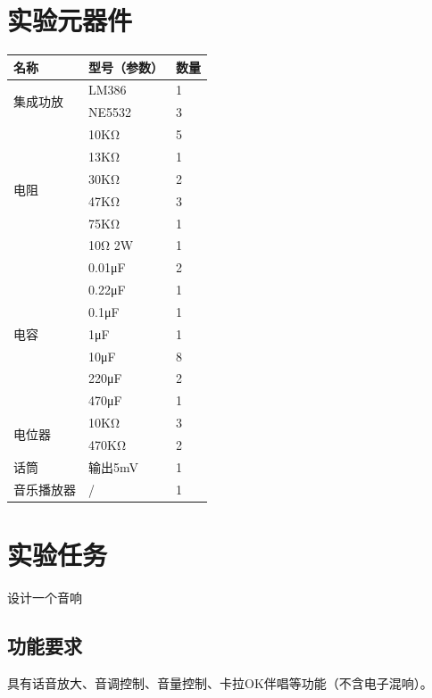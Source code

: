 \documentclass[a4paper]{article}
\theoremstyle{definition}
\theoremstyle{plain}
\theoremstyle{remark}
\begin{document}
\section{实验元器件}
\begin{table}[H]
	\centering
	\begin{tabularx}{0.8\textwidth}{|X|X|X|}
		\hline
		名称                    & 型号（参数） & 数量 \\ \hline
		\multirow{2}{*}{集成功放} & LM386  & 1  \\ \cline{2-3}
		                      & NE5532 & 3  \\ \hline
		\multirow{6}{*}{电阻}   & 10KΩ   & 5  \\ \cline{2-3}
		                      & 13KΩ   & 1  \\ \cline{2-3}
		                      & 30KΩ   & 2  \\ \cline{2-3}
		                      & 47KΩ   & 3  \\ \cline{2-3}
		                      & 75KΩ   & 1  \\ \cline{2-3}
		                      & 10Ω 2W & 1  \\ \hline
		\multirow{7}{*}{电容}   & 0.01μF & 2  \\ \cline{2-3}
		                      & 0.22μF & 1  \\ \cline{2-3}
		                      & 0.1μF  & 1  \\ \cline{2-3}
		                      & 1μF    & 1  \\ \cline{2-3}
		                      & 10μF   & 8  \\ \cline{2-3}
		                      & 220μF  & 2  \\ \cline{2-3}
		                      & 470μF  & 1  \\ \hline
		\multirow{2}{*}{电位器}  & 10KΩ   & 3  \\ \cline{2-3}
		                      & 470KΩ  & 2  \\ \hline
		话筒                    & 输出5mV  & 1  \\ \hline
		音乐播放器                 & /      & 1  \\ \hline
	\end{tabularx}
\end{table}
\section{实验任务}
设计一个音响
\subsection{功能要求}
具有话音放大、音调控制、音量控制、卡拉OK伴唱等功能（不含电子混响）。
\end{document}
